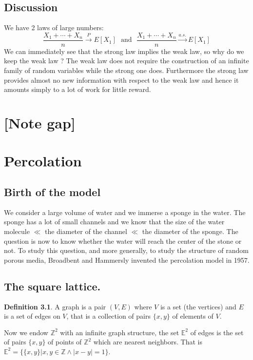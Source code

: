 \documentclass[10pt,a4paper]{book}
\theoremstyle{definition}
\newtheorem{definition}{Definition}[section]
\begin{document}
\section{Discussion}

We have 2 laws of large numbers:
\[
\frac{X_1 + \cdots + X_n}{n} \stackrel{P}{\longrightarrow} E[X_1] \mbox{~~and~~} \frac{X_1 + \cdots + X_n}{n} \stackrel{a.s.}{\longrightarrow} E[X_1]
\]
We can immediately see that the strong law implies the weak law, so why do we keep the weak law ? The weak law does not require the construction of an infinite family of random variables while the strong one does. Furthermore the strong law provides almost no new information with respect to the weak law and hence it amounts simply to a lot of work for little reward.

\chapter{[Note gap]}

\chapter{Percolation}

\section{Birth of the model}

We consider a large volume of water and we immerse a sponge in the water. The sponge has a lot of small channels and we know that the size of the water molecule $\ll$ the diameter of the channel $\ll$ the diameter of the sponge. The question is now to know whether the water will reach the center of the stone or not. To study this question, and more generally, to study the structure of random porous media, Broadbent and Hammersly invented the percolation model in 1957. 

\section{The square lattice.}

\begin{definition}
A graph is a pair $(V, E)$ where $V$ is a set (the vertices) and $E$ is a set of edges on $V$, that is a collection of pairs $\{x, y\}$ of elements of $V$. 
\end{definition}

Now we endow $\mathbb{Z}^2$ with an infinite graph structure, the set $\mathbb{E}^2$ of edges is the set of pairs $\{x, y\}$ of points of $\mathbb{Z}^2$ which are nearest neighbors. That is $\mathbb{E}^2 = \{ \{x, y\} | x, y \in \mathbb{Z} \land |x - y| = 1\}$. 
\end{document}
